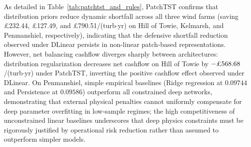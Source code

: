 As detailed in Table~\ref{tab:patchtst_and_rules}, PatchTST confirms that distribution priors reduce dynamic shortfall across all three wind farms (saving \pounds 232.44, \pounds 127.49, and \pounds 790.51/(turb$\cdot$yr) on Hill of Towie, Kelmarsh, and Penmanshiel, respectively), indicating that the defensive shortfall reduction observed under DLinear persists in non-linear patch-based representations. However, net balancing cashflow diverges sharply between architectures: distribution regularization decreases net cashflow on Hill of Towie by $-\text{\pounds} 568.68$/(turb$\cdot$yr) under PatchTST, inverting the positive cashflow effect observed under DLinear. On Penmanshiel, simple empirical baselines (Ridge regression at $0.09744$ and Persistence at $0.09586$) outperform all constrained deep networks, demonstrating that external physical penalties cannot uniformly compensate for deep parameter overfitting in low-sample regimes; the high competitiveness of unconstrained linear baselines underscores that deep physics constraints must be rigorously justified by operational risk reduction rather than assumed to outperform simpler models.

